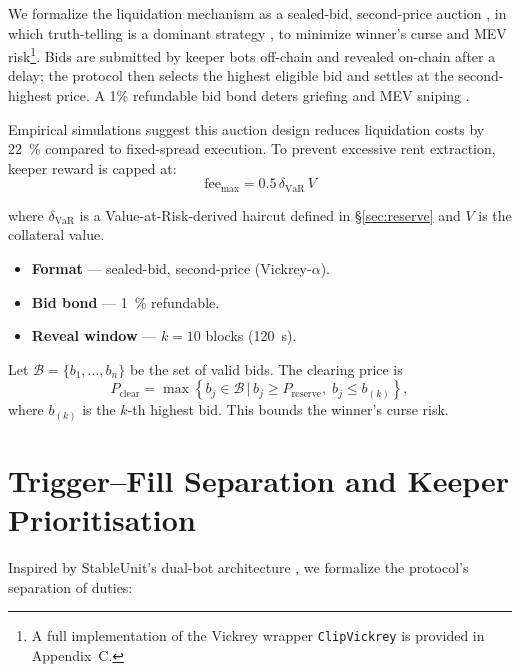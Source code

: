 \documentclass[11pt]{article}
\newcommand{\secref}[1]{\hyperref[#1]{\S\ref*{#1}}}
\begin{document}
We formalize the liquidation mechanism as a sealed-bid, second-price auction \parencite{vickrey1961counterspeculation}, in which truth-telling is a dominant strategy \parencite{myerson1994bayesian}, to minimize winner’s curse and MEV risk\textcolor{darkgreen}{\footnote{A full implementation of the Vickrey wrapper \texttt{ClipVickrey} is provided in Appendix~C.}}. Bids are submitted by keeper bots off-chain and revealed on-chain after a delay; the protocol then selects the highest eligible bid and settles at the second-highest price. A 1\% refundable bid bond deters griefing and MEV sniping \parencite{tian2025defi}.

Empirical simulations suggest this auction design reduces liquidation costs by \SI{22}{\percent} compared to fixed-spread execution. To prevent excessive rent extraction, keeper reward is capped at:
\begin{equation}
\text{fee}_{\max} = 0.5\, \delta_{\text{VaR}}\, V
\end{equation}

where \(\delta_{\text{VaR}}\) is a Value-at-Risk-derived haircut defined in \secref{sec:reserve} and \( V \) is the collateral value.

\begin{itemize}[leftmargin=*]
  \item \textbf{Format} — sealed-bid, second-price (Vickrey-$\alpha$).
  \item \textbf{Bid bond} — \SI{1}{\percent} refundable.
  \item \textbf{Reveal window} — $k{=}10$ blocks (\SI{120}{\second}).
\end{itemize}

Let $\mathcal{B} = \{b_1, \dots, b_n\}$ be the set of valid bids. The clearing price is
\[
P_{\text{clear}} = \max\left\{ b_j \in \mathcal{B} \,|\, b_j \geq P_{\text{reserve}},\; b_j \leq b_{(k)} \right\},
\]
where $b_{(k)}$ is the $k$-th highest bid. This bounds the winner's curse risk.


\section{Trigger–Fill Separation and Keeper Prioritisation}
\label{sec:bots}
Inspired by StableUnit’s dual-bot architecture \parencite{stableunit2025spec}, we formalize the protocol's separation of duties:
\end{document}
